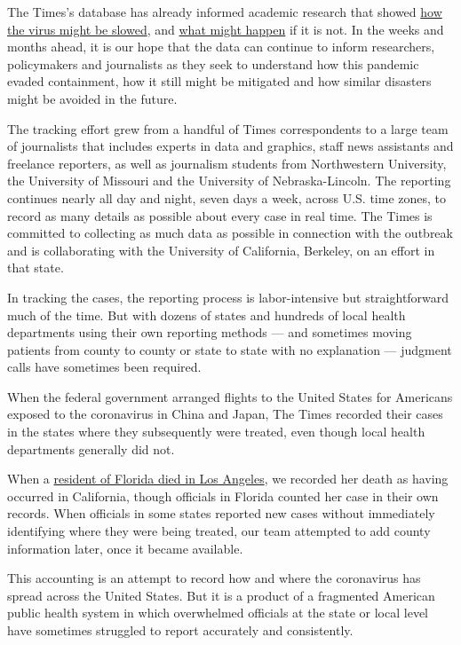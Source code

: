 The Times's database has already informed academic research that showed
\href{https://www.nytimes3xbfgragh.onion/interactive/2020/03/20/us/coronavirus-model-us-outbreak.html}{how
the virus might be slowed}, and
\href{https://www.gainesville.com/opinion/20200325/stephen-j-hagen-and-peter-j-hirschfeld-florida-must-be-locked-down-now}{what
might happen} if it is not. In the weeks and months ahead, it is our
hope that the data can continue to inform researchers, policymakers and
journalists as they seek to understand how this pandemic evaded
containment, how it still might be mitigated and how similar disasters
might be avoided in the future.

The tracking effort grew from a handful of Times correspondents to a
large team of journalists that includes experts in data and graphics,
staff news assistants and freelance reporters, as well as journalism
students from Northwestern University, the University of Missouri and
the University of Nebraska-Lincoln. The reporting continues nearly all
day and night, seven days a week, across U.S. time zones, to record as
many details as possible about every case in real time. The Times is
committed to collecting as much data as possible in connection with the
outbreak and is collaborating with the University of California,
Berkeley, on an effort in that state.

In tracking the cases, the reporting process is labor-intensive but
straightforward much of the time. But with dozens of states and hundreds
of local health departments using their own reporting methods --- and
sometimes moving patients from county to county or state to state with
no explanation --- judgment calls have sometimes been required.

When the federal government arranged flights to the United States for
Americans exposed to the coronavirus in China and Japan, The Times
recorded their cases in the states where they subsequently were treated,
even though local health departments generally did not.

When a
\href{https://www.nytimes3xbfgragh.onion/2020/03/22/us/coronavirus-deaths-united-states.html}{resident
of Florida died in Los Angeles}, we recorded her death as having
occurred in California, though officials in Florida counted her case in
their own records. When officials in some states reported new cases
without immediately identifying where they were being treated, our team
attempted to add county information later, once it became available.

This accounting is an attempt to record how and where the coronavirus
has spread across the United States. But it is a product of a fragmented
American public health system in which overwhelmed officials at the
state or local level have sometimes struggled to report accurately and
consistently.

